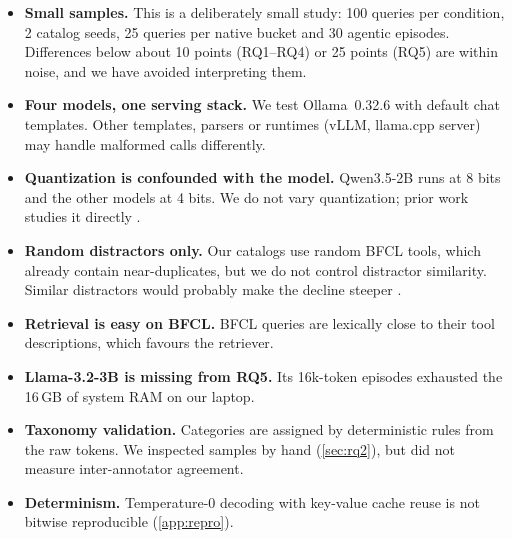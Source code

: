 \begin{itemize}
  \item \textbf{Small samples.} This is a deliberately small study: 100 queries per condition, 2 catalog seeds, 25 queries per native bucket and 30 agentic episodes. Differences below about 10 points (RQ1--RQ4) or 25 points (RQ5) are within noise, and we have avoided interpreting them.
  \item \textbf{Four models, one serving stack.} We test Ollama~0.32.6 with default chat templates. Other templates, parsers or runtimes (vLLM, llama.cpp server) may handle malformed calls differently.
  \item \textbf{Quantization is confounded with the model.} Qwen3.5-2B runs at 8 bits and the other models at 4 bits. We do not vary quantization; prior work studies it directly \citep{roshaan2026compression, singh2026samequant}.
  \item \textbf{Random distractors only.} Our catalogs use random BFCL tools, which already contain near-duplicates, but we do not control distractor similarity. Similar distractors would probably make the decline steeper \citep{rabinovich2025robustness}.
  \item \textbf{Retrieval is easy on BFCL.} BFCL queries are lexically close to their tool descriptions, which favours the retriever.
  \item \textbf{Llama-3.2-3B is missing from RQ5.} Its 16k-token episodes exhausted the 16\,GB of system RAM on our laptop.
  \item \textbf{Taxonomy validation.} Categories are assigned by deterministic rules from the raw tokens. We inspected samples by hand (\cref{sec:rq2}), but did not measure inter-annotator agreement.
  \item \textbf{Determinism.} Temperature-0 decoding with key-value cache reuse is not bitwise reproducible (\cref{app:repro}).
\end{itemize}

